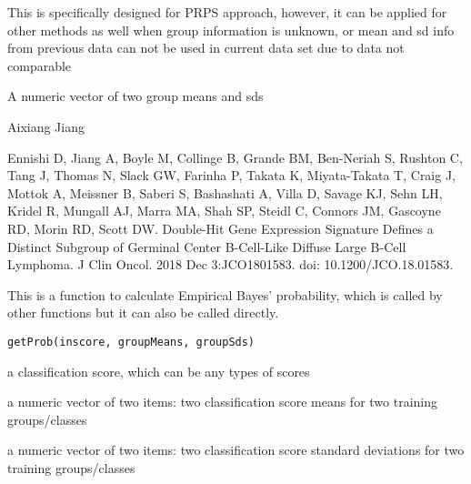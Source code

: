 \documentclass[letterpaper]{book}
\begin{document}
%
\begin{Details}\relax
This is specifically designed for PRPS approach, however, it can be applied for other methods as well when 
group information is unknown, or mean and sd info from previous data can not be used in current data set 
due to data not comparable
\end{Details}
%
\begin{Value}
A numeric vector of two group means and sds
\end{Value}
%
\begin{Author}\relax
Aixiang Jiang
\end{Author}
%
\begin{References}\relax
Ennishi D, Jiang A, Boyle M, Collinge B, Grande BM, Ben-Neriah S, Rushton C, Tang J, Thomas N, Slack GW, Farinha P,
Takata K, Miyata-Takata T, Craig J, Mottok A, Meissner B, Saberi S, Bashashati A, Villa D, Savage KJ, Sehn LH, 
Kridel R, Mungall AJ, Marra MA, Shah SP, Steidl C, Connors JM, Gascoyne RD, Morin RD, Scott DW. 
Double-Hit Gene Expression Signature Defines a Distinct Subgroup of Germinal Center B-Cell-Like Diffuse Large B-Cell Lymphoma.
J Clin Oncol. 2018 Dec 3:JCO1801583. doi: 10.1200/JCO.18.01583.
\end{References}
%
\begin{Description}\relax
This is a function to calculate Empirical Bayes' probability, 
which is called by other functions but it can also be called directly.
\end{Description}
%
\begin{Usage}
\begin{verbatim}
getProb(inscore, groupMeans, groupSds)
\end{verbatim}
\end{Usage}
%
\begin{Arguments}
\begin{ldescription}
\item[\code{inscore}] a classification score, which can be any types of scores

\item[\code{groupMeans}] a numeric vector of two items: two classification score means for two training groups/classes

\item[\code{groupSds}] a numeric vector of two items: two classification score standard deviations for two training groups/classes
\end{ldescription}
\end{Arguments}
\end{document}
